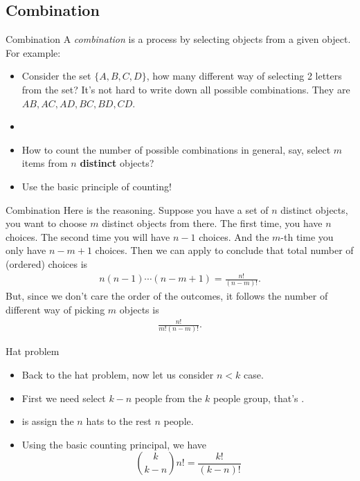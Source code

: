 \subsection{Combination}
\begin{frame}{Combination}
A \textit{combination} is a process by selecting objects from a given object. For example:
\begin{itemize}
    \item Consider the set $\{A,B,C,D\}$, how many different way of selecting 2 letters from the set? It's not hard to write down all possible combinations. They are $AB,AC,AD,BC,BD,CD$.
    \item {}
    \item {} How to count the number of possible combinations in general, say, select $m$ items from $n$ \textbf{distinct} objects?
    \item Use the basic principle of counting!
\end{itemize}
    
\end{frame}

\begin{frame}{Combination}
Here is the reasoning. Suppose you have a set of $n$ distinct objects, you want to choose $m$ distinct objects from there. The first time, you have $n$ choices. The second time you will have $n-1$ choices. And the $m$-th time you only have $n-m+1$ choices. Then we can apply  to conclude that total number of (ordered) choices is 
\begin{align*}
    n(n-1)\cdots (n-m+1)=\frac{n!}{(n-m)!}.
\end{align*}
But, since we don't care the order of the outcomes, it follows the number of different way of picking $m$ objects is
\begin{align*}
    \frac{n!}{m!(n-m)!}.
\end{align*}
    
\end{frame}

\begin{frame}{Hat problem}
	\begin{itemize}
		\item Back to the hat problem, now let us consider $n< k$ case.
		\item First we need select $k-n$ people from the $k$ people group, that's .
		\item {} is assign the $n$ hats to the rest $n$ people.
		\item Using the basic counting principal, we have
		\[\binom{k}{k-n}n!=\frac{k!}{(k-n)!}\]
	\end{itemize}
\end{frame}


